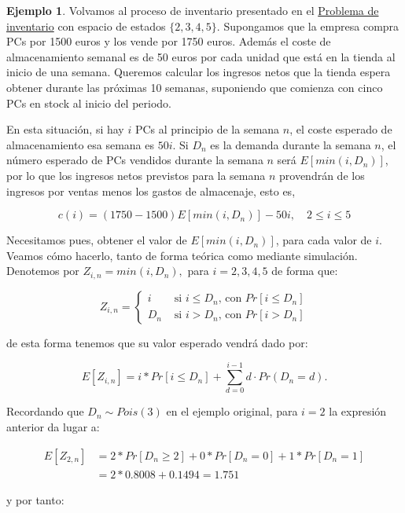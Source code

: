 \documentclass[
]{book}
\theoremstyle{definition}
\theoremstyle{definition}
\newtheorem{example}{Ejemplo}[chapter]
\theoremstyle{definition}
\theoremstyle{definition}
\theoremstyle{remark}
\begin{document}
\begin{example}
Volvamos al proceso de inventario presentado en el \protect\hyperlink{inventario}{Problema de inventario} con espacio de estados \(\{2,3,4,5\}\). Supongamos que la empresa compra PCs por 1500 euros y los vende por 1750 euros. Además el coste de almacenamiento semanal es de 50 euros por cada unidad que está en la tienda al inicio de una semana. Queremos calcular los ingresos netos que la tienda espera obtener durante las próximas 10 semanas, suponiendo que comienza con cinco PCs en stock al inicio del periodo.
\end{example}

En esta situación, si hay \(i\) PCs al principio de la semana \(n\), el coste esperado de almacenamiento esa semana es \(50i\). Si \(D_n\) es la demanda durante la semana \(n\), el número esperado de PCs vendidos durante la semana \(n\) será \(E[min(i, D_n)]\), por lo que los ingresos netos previstos para la semana \(n\) provendrán de los ingresos por ventas menos los gastos de almacenaje, esto es,

\[c(i) = (1750-1500)E[min(i, D_n)] -50i, \quad 2 \leq i \leq 5\]

Necesitamos pues, obtener el valor de \(E[min(i, D_n)]\), para cada valor de \(i\). Veamos cómo hacerlo, tanto de forma teórica como mediante simulación. Denotemos por \(Z_{i,n} = min(i, D_n),\) para \(i=2, 3, 4, 5\) de forma que:

\begin{equation*}
Z_{i,n} =  
\begin{cases}
i & \text{ si } i \leq D_n \text{, con } Pr[i \leq D_n]\\
D_n & \text{ si } i > D_n \text{, con } Pr[i > D_n]
\end{cases}
\end{equation*}

de esta forma tenemos que su valor esperado vendrá dado por:

\[E[Z_{i,n}] = i*Pr[i \leq D_n] + \sum_{d=0}^{i-1} d \cdot Pr(D_n=d).\]

Recordando que \(D_n\sim Pois(3)\) en el ejemplo original, para \(i=2\) la expresión anterior da lugar a:

\begin{eqnarray*}
E[Z_{2,n}] &= 2*Pr[D_n \geq 2] + 0*Pr[D_n = 0] + 1*Pr[D_n =1] \\
&= 2*0.8008+0.1494 = 1.751
\end{eqnarray*}

y por tanto:
\end{document}
